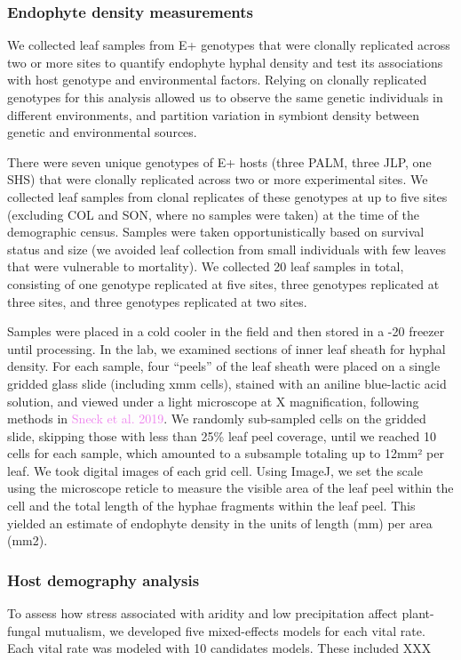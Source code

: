 \documentclass[12pt,english]{article}
\begin{document}
\begin{spacing}{1.9}
\subsubsection*{Endophyte density measurements}
We collected leaf samples from E+ genotypes that were clonally replicated across two or more sites to quantify endophyte hyphal density and test its associations with host genotype and environmental factors. 
Relying on clonally replicated genotypes for this analysis allowed us to observe the same genetic individuals in different environments, and partition variation in symbiont density between genetic and environmental sources. 

There were seven unique genotypes of E+ hosts (three PALM, three JLP, one SHS) that were clonally replicated across two or more experimental sites. 
We collected leaf samples from clonal replicates of these genotypes at up to five sites (excluding COL and SON, where no samples were taken) at the time of the demographic census.
Samples were taken opportunistically based on survival status and size (we avoided leaf collection from small individuals with few leaves that were vulnerable to mortality).
We collected 20 leaf samples in total, consisting of one genotype replicated at five sites, three genotypes replicated at three sites, and three genotypes replicated at two sites. 

Samples were placed in a cold cooler in the field and then stored in a -20 freezer until processing.
In the lab, we examined sections of inner leaf sheath for hyphal density. 
For each sample, four “peels” of the leaf sheath were placed on a single gridded glass slide (including xmm cells), stained with an aniline blue-lactic acid solution, and viewed under a light microscope at X magnification, following methods in \textcolor{violet}{Sneck et al. 2019}. 
We randomly sub-sampled cells on the gridded slide, skipping those with less than 25\% leaf peel coverage, until we reached 10 cells for each sample, which amounted to a subsample totaling up to 12mm² per leaf.
We took digital images of each grid cell. 
Using ImageJ, we set the scale using the microscope reticle to measure the visible area of the leaf peel within the cell and the total length of the hyphae fragments within the leaf peel.
This yielded an estimate of endophyte density in the units of length (mm) per area (mm2). 

\subsubsection*{Host demography analysis}
To assess how stress associated with aridity and low precipitation affect plant-fungal mutualism, we developed five mixed-effects models for each vital rate. 
Each vital rate was modeled with 10 candidates models. 
These included XXX


\end{spacing}
\end{document}

